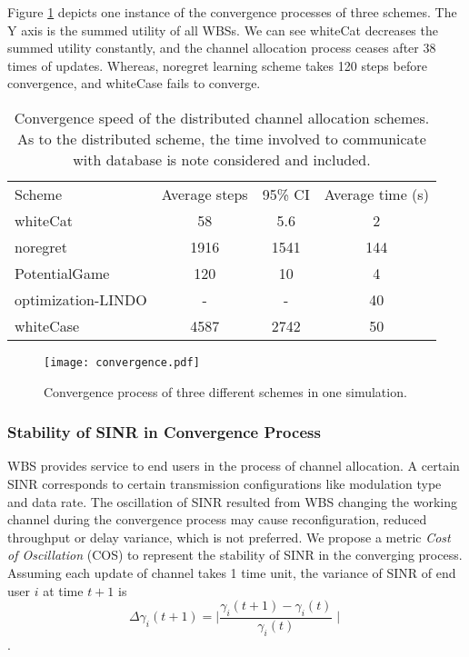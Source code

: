 Figure \ref{convergeComp} depicts one instance of the convergence processes of three schemes.
The Y axis is the summed utility of all WBSs.
We can see whiteCat decreases the summed utility constantly, and the channel allocation process ceases after 38 times of updates.
Whereas, noregret learning scheme takes 120 steps before convergence, and whiteCase fails to converge.
\begin{table}[!h]
\centering
\begin{tabular}{|l|c|c|c|}
  \hline
  Scheme			 						& Average steps 	 		& 95\% CI			&Average time (s)\\
    \hhline{|=|=|=|=|}
  whiteCat									& 58						& 5.6						&2\\\hline
  noregret									& 1916						& 1541						&144\\\hline
  PotentialGame~\cite{pimrc_2012}			& 120						& 10						&4\\\hline
  optimization-LINDO						& -                         & -                         &40\\\hline
  whiteCase 								& 4587 						& 2742						&50\\  
  \hline
\end{tabular}
\caption{Convergence speed of the distributed channel allocation schemes. As to the distributed scheme, the time involved to communicate with database is note considered and included.}
\label{convergencespeed}
\end{table}


\begin{figure}[h!]
  \centering
  \texttt{[image: convergence.pdf]}
  \caption{Convergence process of three different schemes in one simulation.}
\label{convergeComp}
\end{figure}




\subsubsection*{Stability of SINR in Convergence Process}
WBS provides service to end users in the process of channel allocation. 
A certain SINR corresponds to certain transmission configurations like modulation type and data rate. 
The oscillation of SINR resulted from WBS changing the working channel during the convergence process may cause reconfiguration, reduced throughput or delay variance, which is not preferred.
We propose a metric \textit{Cost of Oscillation} (\gls{COS}) to represent the stability of SINR in the converging process.
Assuming each update of channel takes 1 time unit, the variance of SINR of end user $i$ at time $t+1$ is \[\varDelta  \gamma_i(t+1)=\mid\frac{\gamma_i(t+1)-\gamma_i(t)}{\gamma_i(t)} \mid\]. 


